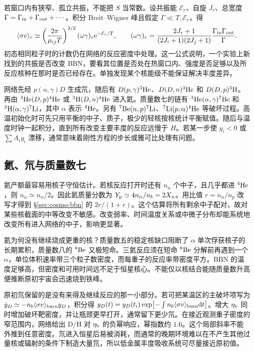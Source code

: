 若窗口内有狭窄、孤立共振，不能把 $S$ 当常数。设共振能 $\mathcal E_r$、自旋 $J_r$、总宽度 $\Gamma=\Gamma_{\rm in}+\Gamma_{\rm out}+\cdots$。积分 Breit--Wigner 峰且假定 $\Gamma\ll T,\mathcal E_r$，得
\[
 \langle\sigma v\rangle_r\simeq
 \left(\frac{2\pi}{\mu_{ij}T}\right)^{3/2}
 (\omega\gamma)_r\mathrm{e}^{-\mathcal E_r/T},\qquad
 (\omega\gamma)_r=
 \frac{2J_r+1}{(2J_i+1)(2J_j+1)}
 \frac{\Gamma_{\rm in}\Gamma_{\rm out}}{\Gamma}.
\]
初态相同粒子时的计数仍在网络的反应密度中处理。这一公式说明，一个实验上新找到的共振是否改变 BBN，要看其位置是否处在热窗口内、强度是否足够以及所反应核种在那时是否已经存在。单独发现某个核能级不能保证解决丰度差异。

网络先经 $p(n,\gamma)D$ 生成氘，随后有 $D(p,\gamma)^3{\rm He}$、$D(D,n)^3{\rm He}$ 和 $D(D,p)^3{\rm H}$。再由 $^3{\rm He}(D,p)^4{\rm He}$ 或 $^3{\rm H}(D,n)^4{\rm He}$ 进入氦。质量数七的链有 $^3{\rm He}(\alpha,\gamma)^7{\rm Be}$ 和 $^3{\rm H}(\alpha,\gamma)^7{\rm Li}$，其中 $\alpha$ 表示 $^4{\rm He}$。另有 $^7{\rm Be}(n,p)^7{\rm Li}$、$^7{\rm Li}(p,\alpha)^4{\rm He}$ 等破坏过程。高温初始化时可先只用平衡的中子、质子，极少的轻核按核统计平衡赋值。随后与温度时钟一起积分，直到所有改变主要丰度的反应远慢于 $H$。若某一步使 $y_i<0$ 或 $\sum A_i y_i$ 漂移，通常意味着刚性方程的步长或雅可比处理有问题。

\subsection{氦、氘与质量数七}

氦产额最容易用核子守恒估计。若核反应打开时还有 $n_n$ 个中子，且几乎都进 $^4{\rm He}$，则 $n_\alpha\simeq n_n/2$。因此氦质量分数为 $Y_{\rm p}\simeq4n_\alpha/n_b=2X_n$。用比值 $r=n_n/n_p$ 改写才得到 \S\ref{sec:cosmo-bbn} 的 $2r/(1+r)$。这个估算将所有剩余中子配对，故对某些核截面的中等改变不敏感。改变弱率、时间温度关系或中微子分布却能系统地改变所有进入网络的中子，影响更显著。

氦为何没有继续烧成更重的核？质量数五的稳定核缺口阻断了 $\alpha$ 单次俘获核子的长期累积，质量数八的 $^8{\rm Be}$ 又极短命。三氦反应须在短命 $^8{\rm Be}$ 分解前再遇到一个 $\alpha$，单位体积速率带三个粒子数密度，而每重子的反应率带密度平方。BBN 的温度足够高，但密度和可用时间远不足于恒星核心。不能仅以核结合能随质量数升高便推断原初宇宙会迅速烧到铁峰。

原初氘保留的是没有来得及继续反应的那一小部分。若可把某温区的主破坏项写为 $\dot y_D\simeq-n_b\langle\sigma v\rangle_{\rm burn}y_D$，积分得 $y_D(t)=y_D(t_i)\exp[-\int n_b\langle\sigma v\rangle_{\rm burn}\dd t]$。增大 $\eta_{\rm b}$ 同时增加破坏靶密度，并让瓶颈更早打开，通常留下更少氘。在接近观测重子密度的窄范围内，网络给出 $\mathrm{D/H}$ 对 $\eta_{\rm b}$ 的负幂响应，幂指数约 $1.6$。这个局部斜率不能外推到任意密度。氘进入恒星后易被消耗，而通常的晚期环境难以在不产生其他过量核或辐射的条件下制造大量氘，所以低金属丰度吸收系统可尽量接近原初值。

